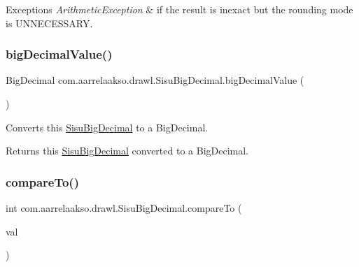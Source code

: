 \begin{DoxyExceptions}{Exceptions}
{\em Arithmetic\+Exception} & if the result is inexact but the rounding mode is U\+N\+N\+E\+C\+E\+S\+S\+A\+RY. \\
\hline
\end{DoxyExceptions}
\mbox{\label{classcom_1_1aarrelaakso_1_1drawl_1_1_sisu_big_decimal_a48686473be6df9038c67d2cefa26c311}} 
\subsubsection{\texorpdfstring{big\+Decimal\+Value()}{bigDecimalValue()}}
{\footnotesize\ttfamily Big\+Decimal com.\+aarrelaakso.\+drawl.\+Sisu\+Big\+Decimal.\+big\+Decimal\+Value (\begin{DoxyParamCaption}{ }\end{DoxyParamCaption})\hspace{0.3cm}{\ttfamily [protected]}}

Converts this \hyperlink{classcom_1_1aarrelaakso_1_1drawl_1_1_sisu_big_decimal}{Sisu\+Big\+Decimal} to a Big\+Decimal.

\begin{DoxyReturn}{Returns}
this \hyperlink{classcom_1_1aarrelaakso_1_1drawl_1_1_sisu_big_decimal}{Sisu\+Big\+Decimal} converted to a Big\+Decimal. 
\end{DoxyReturn}
\mbox{\label{classcom_1_1aarrelaakso_1_1drawl_1_1_sisu_big_decimal_a450f5da2c47612d8af98e59958ebccc6}} 
\subsubsection{\texorpdfstring{compare\+To()}{compareTo()}}
{\footnotesize\ttfamily int com.\+aarrelaakso.\+drawl.\+Sisu\+Big\+Decimal.\+compare\+To (\begin{DoxyParamCaption}\item[{\hyperlink{classcom_1_1aarrelaakso_1_1drawl_1_1_sisu_big_decimal}{Sisu\+Big\+Decimal}}]{val }\end{DoxyParamCaption})}

